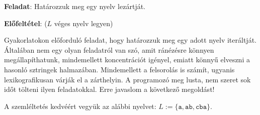 \documentclass[a4paper,11pt]{article}
\begin{document}
\begin{mdframed}
	\textbf{Feladat}: Határozzuk meg egy nyelv lezártját.
	
	\textbf{Előfeltétel}: ($L$ véges nyelv legyen)
\end{mdframed}

Gyakorlatokon előforduló feladat, hogy határozzuk meg egy adott nyelv iteráltját. Általában nem egy olyan feladatról van szó, amit ránézésre könnyen megállapíthatunk, mindemellett koncentrációt igényel, emiatt könnyű elveszni a hasonló sztringek halmazában. Mindemellett a felsorolás is számít, ugyanis lexikografikusan várják el a zárthelyin. A programozó meg lusta, nem szeret sok időt tölteni ilyen feladatokkal. Erre javaslom a következő megoldást!


A szemléltetés kedvéért vegyük az alábbi nyelvet: $L := \{ \texttt{a}, \texttt{ab}, \texttt{cba} \}$.
\end{document}
